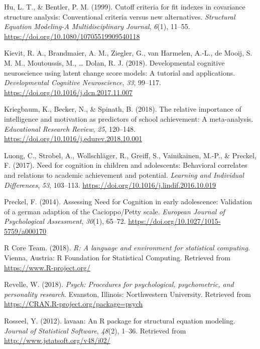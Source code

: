 \documentclass[
  man]{apa6}
\newlength{\cslhangindent}
\newlength{\cslentryspacingunit} %
\newenvironment{CSLReferences}[2] %
 {%
  \setlength{\parindent}{0pt}
  \ifodd #1
  \let\oldpar\par
  \def\par{\hangindent=\cslhangindent\oldpar}
  \fi
  \setlength{\parskip}{#2\cslentryspacingunit}
 }%
 {}
\begin{document}
\begin{CSLReferences}{1}{0}
\leavevmode{}%
Hu, L. T., \& Bentler, P. M. (1999). Cutoff criteria for fit indexes in covariance structure analysis: Conventional criteria versus new alternatives. \emph{Structural Equation Modeling-A Multidisciplinary Journal}, \emph{6}(1), 11--55. \url{https://doi.org/10.1080/10705519909540118}

\leavevmode{}%
Kievit, R. A., Brandmaier, A. M., Ziegler, G., van Harmelen, A.-L., de Mooij, S. M. M., Moutoussis, M., \ldots{} Dolan, R. J. (2018). Developmental cognitive neuroscience using latent change score models: A tutorial and applications. \emph{Developmental Cognitive Neuroscience}, \emph{33}, 99--117. \url{https://doi.org/10.1016/j.dcn.2017.11.007}

\leavevmode{}%
Kriegbaum, K., Becker, N., \& Spinath, B. (2018). The relative importance of intelligence and motivation as predictors of school achievement: A meta-analysis. \emph{Educational Research Review}, \emph{25}, 120--148. \url{https://doi.org/10.1016/j.edurev.2018.10.001}

\leavevmode{}%
Luong, C., Strobel, A., Wollschläger, R., Greiff, S., Vainikainen, M.-P., \& Preckel, F. (2017). Need for cognition in children and adolescents: Behavioral correlates and relations to academic achievement and potential. \emph{Learning and Individual Differences}, \emph{53}, 103--113. \url{https://doi.org/10.1016/j.lindif.2016.10.019}

\leavevmode{}%
Preckel, F. (2014). Assessing {Need} for {Cognition} in early adolescence: Validation of a german adaption of the {Cacioppo}/{Petty} scale. \emph{European Journal of Psychological Assessment}, \emph{30}(1), 65--72. \url{https://doi.org/10.1027/1015-5759/a000170}

\leavevmode{}%
R Core Team. (2018). \emph{R: A language and environment for statistical computing}. Vienna, Austria: R Foundation for Statistical Computing. Retrieved from \url{https://www.R-project.org/}

\leavevmode{}%
Revelle, W. (2018). \emph{Psych: Procedures for psychological, psychometric, and personality research}. Evanston, Illinois: Northwestern University. Retrieved from \url{https://CRAN.R-project.org/package=psych}

\leavevmode{}%
Rosseel, Y. (2012). {lavaan}: An {R} package for structural equation modeling. \emph{Journal of Statistical Software}, \emph{48}(2), 1--36. Retrieved from \url{http://www.jstatsoft.org/v48/i02/}


\end{CSLReferences}
\end{document}
